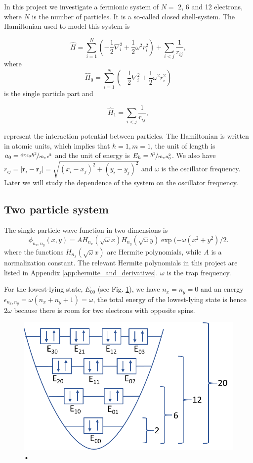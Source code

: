 In this project we investigate a fermionic system of $N=$ 2, 6 and 12 electrons, where $N$ is the number of particles. It is a so-called closed shell-system. The Hamiltonian used to model this system is

\begin{equation}
\label{eq:finalH}
\hat{H}=\sum_{i=1}^{N} \left(  -\frac{1}{2} \nabla_i^2 + \frac{1}{2} \omega^2r_i^2  \right)+\sum_{i<j}\frac{1}{r_{ij}},
\end{equation}
where 
$$\hat{H}_0=\sum_{i=1}^{N} \left(  -\frac{1}{2} \nabla_i^2 + \frac{1}{2} \omega^2r_i^2  \right)$$
is the single particle part and

\begin{equation}\label{eq:hamilton_interaction}
\hat{H}_1=\sum_{i<j}\frac{1}{r_{ij}},
\end{equation}

represent the interaction potential between particles. The Hamiltonian is written in atomic units, which implies that $\hbar = 1, m= 1$, the unit of length is $a_0 = \nicefrac{4 \pi \epsilon_0 \hbar^2}{m_e e^2}$ and the unit of energy is $E_h = \nicefrac{\hbar^2}{m_e a_0^2}$.  We also have $r_{ij}=\vert \bm{r}_i-\bm{r}_j\vert= \sqrt{(x_i-x_j)^2 + (y_i-y_j)^2}$ and $\omega$ is the oscillator frequency. Later we will study the dependence of the system on the oscillator frequency. 

\subsection{Two particle system}

The single particle wave function in two dimensions is
\begin{equation}\label{eq:single_particle_wf}
\phi_{n_x,n_y}(x,y) = A H_{n_x}(\sqrt{\omega}x)H_{n_y}(\sqrt{\omega}y)\exp{(-\omega(x^2+y^2)/2}.
\end{equation}
where the functions $H_{n_x}(\sqrt{\omega}x)$ are Hermite polynomials,  while $A$ is a normalization constant. The relevant Hermite polynomials in this project are listed in Appendix \ref{app:hermite_and_derivatives}. $\omega$ is the trap frequency.

For the lowest-lying state, $E_{00}$  (see Fig. \ref{fig:states}), we have $n_x=n_y=0$ and an energy $\epsilon_{n_x,n_y}=\omega(n_x+n_y+1) = \omega$, the total energy of the lowest-lying state is hence $2\omega$ because there is room for two electrons with opposite spins. 

\begin{figure}[H]
\center
\includegraphics[width=0.6\linewidth]{../Results/states}\caption{•}\label{fig:states}
\end{figure}

